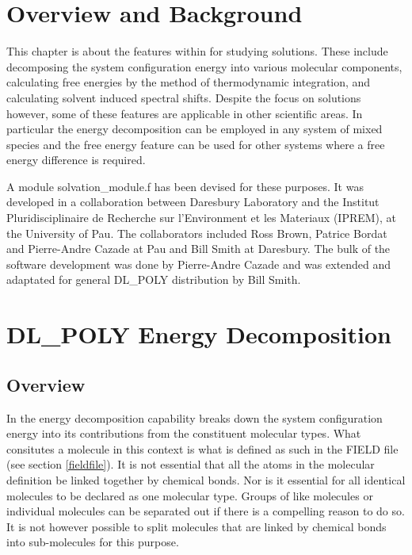 
\section{Overview and Background}
 
This chapter is about the features within \D{} for studying solutions. These
include decomposing the system configuration energy into various molecular
components, calculating free energies by the method of thermodynamic
integration, and calculating solvent induced spectral shifts. Despite the
focus on solutions however, some of these features are applicable in other
scientific areas. In particular the energy decomposition can be employed in
any system of mixed species and the free energy feature can be used for other
systems where a free energy difference is required.

A \D{} module {\sc solvation\_module.f} has been devised for these purposes. It
was developed in a collaboration between Daresbury Laboratory and the Institut
Pluridisciplinaire de Recherche sur l'Environment et les Materiaux (IPREM), at
the University of Pau. The collaborators included Ross Brown, Patrice Bordat
and Pierre-Andre Cazade at Pau and Bill Smith at Daresbury. The bulk of the
software development was done by Pierre-Andre Cazade and was extended and
adaptated for general DL\_POLY distribution by Bill Smith.

\section{DL\_POLY Energy Decomposition}
\label{energy decomposition}
\subsection{Overview}

In \D{} the energy decomposition capability breaks down the system configuration
energy into its contributions from the constituent molecular types. What
consitutes a molecule in this context is what is defined as such in the \D{}
FIELD file (see section \ref{fieldfile}). It is not essential that all the
atoms in the molecular definition be linked together by chemical bonds. Nor is
it essential for all identical molecules to be declared as one molecular type.
Groups of like molecules or individual molecules can be separated out if there
is a compelling reason to do so. It is not however possible to split molecules
that are linked by chemical bonds into sub-molecules for this purpose.

